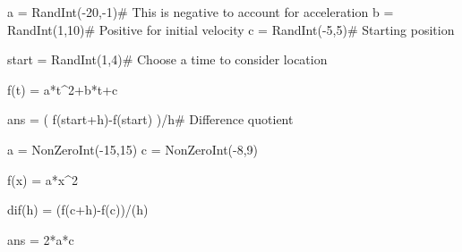 \begin{sagesilent}
a = RandInt(-20,-1)# This is negative to account for acceleration
b = RandInt(1,10)# Positive for initial velocity
c = RandInt(-5,5)# Starting position

start = RandInt(1,4)# Choose a time to consider location

f(t) = a*t^2+b*t+c

ans = ( f(start+h)-f(start) )/h# Difference quotient

\end{sagesilent}


\begin{sagesilent}
a = NonZeroInt(-15,15)
c = NonZeroInt(-8,9)

f(x) = a*x^2

dif(h) = (f(c+h)-f(c))/(h)

ans = 2*a*c

\end{sagesilent}





%
%
%
%
%
%
%
%
%
%
%
%
%
%
%
%
%
%
%
%
%

